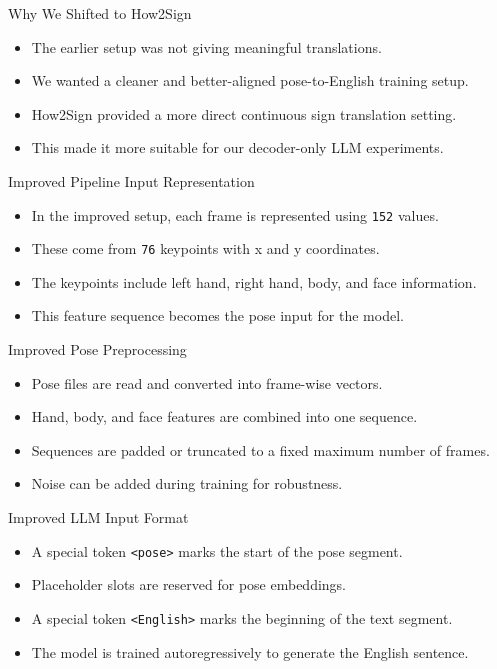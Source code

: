 \documentclass[aspectratio=169]{beamer}
\begin{document}
\begin{frame}{Why We Shifted to How2Sign}
\begin{itemize}
  \item The earlier setup was not giving meaningful translations.
  \item We wanted a cleaner and better-aligned pose-to-English training setup.
  \item How2Sign provided a more direct continuous sign translation setting.
  \item This made it more suitable for our decoder-only LLM experiments.
\end{itemize}
\end{frame}

\begin{frame}{Improved Pipeline Input Representation}
\begin{itemize}
  \item In the improved setup, each frame is represented using \texttt{152} values.
  \item These come from \texttt{76} keypoints with x and y coordinates.
  \item The keypoints include left hand, right hand, body, and face information.
  \item This feature sequence becomes the pose input for the model.
\end{itemize}
\end{frame}

\begin{frame}{Improved Pose Preprocessing}
\begin{itemize}
  \item Pose files are read and converted into frame-wise vectors.
  \item Hand, body, and face features are combined into one sequence.
  \item Sequences are padded or truncated to a fixed maximum number of frames.
  \item Noise can be added during training for robustness.
\end{itemize}
\end{frame}

\begin{frame}{Improved LLM Input Format}
\begin{itemize}
  \item A special token \texttt{<pose>} marks the start of the pose segment.
  \item Placeholder slots are reserved for pose embeddings.
  \item A special token \texttt{<English>} marks the beginning of the text segment.
  \item The model is trained autoregressively to generate the English sentence.
\end{itemize}
\end{frame}
\end{document}
